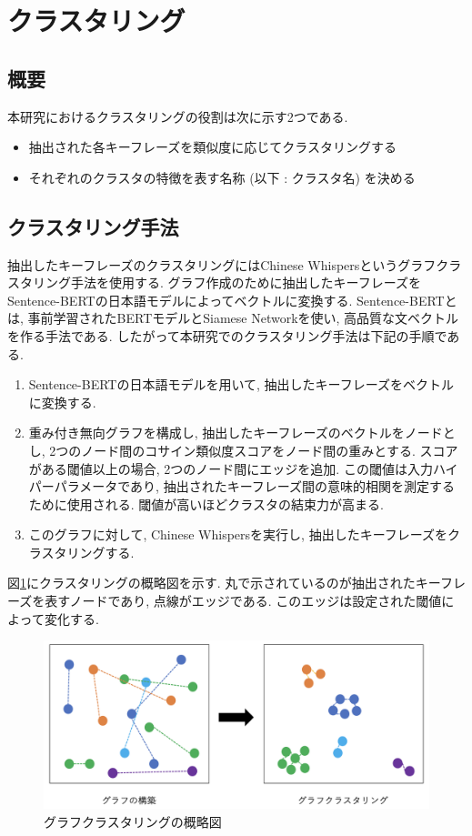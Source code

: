 
\section{クラスタリング}
\subsection{概要}
本研究におけるクラスタリングの役割は次に示す2つである. 
\begin{itemize}
  \item 抽出された各キーフレーズを類似度に応じてクラスタリングする
  \item それぞれのクラスタの特徴を表す名称 (以下 : クラスタ名) を決める
\end{itemize}

\subsection{クラスタリング手法}\label{graph_clustering}
抽出したキーフレーズのクラスタリングにはChinese Whispers\cite{chinese-whispers}というグラフクラスタリング手法を使用する. グラフ作成のために抽出したキーフレーズをSentence-BERTの日本語モデルによってベクトルに変換する. Sentence-BERT\cite{sentence-bert}とは, 事前学習されたBERTモデルとSiamese Networkを使い, 高品質な文ベクトルを作る手法である. 
したがって本研究でのクラスタリング手法は下記の手順である. 
\begin{enumerate}
  \item Sentence-BERTの日本語モデルを用いて, 抽出したキーフレーズをベクトルに変換する. 
  \item 重み付き無向グラフを構成し, 抽出したキーフレーズのベクトルをノードとし, 2つのノード間のコサイン類似度スコアをノード間の重みとする. スコアがある閾値以上の場合, 2つのノード間にエッジを追加. この閾値は入力ハイパーパラメータであり, 抽出されたキーフレーズ間の意味的相関を測定するために使用される. 閾値が高いほどクラスタの結束力が高まる. 
  \item このグラフに対して, Chinese Whispersを実行し, 抽出したキーフレーズをクラスタリングする. 
\end{enumerate}

図\ref{fig:clustering}にクラスタリングの概略図を示す. 丸で示されているのが抽出されたキーフレーズを表すノードであり, 点線がエッジである. このエッジは設定された閾値によって変化する. 
\begin{figure}[H]
  \centering
  \includegraphics[scale=0.4]
       {contents/images/clustering.png}
  \caption{グラフクラスタリングの概略図\label{fig:clustering}}
\end{figure}

